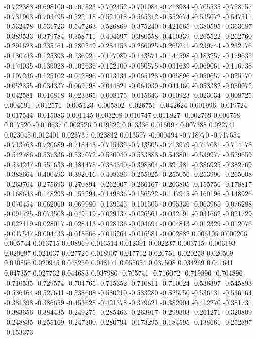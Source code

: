 -0.722388
-0.698100
-0.707323
-0.702452
-0.701084
-0.718984
-0.705535
-0.758757
-0.731903
-0.703495
-0.522118
-0.524018
-0.565312
-0.552674
-0.535072
-0.547311
-0.532478
-0.531723
-0.547263
-0.526869
-0.375240
-0.421665
-0.380595
-0.363687
-0.389533
-0.379784
-0.358711
-0.404697
-0.380558
-0.410339
-0.265522
-0.262760
-0.291628
-0.235461
-0.280249
-0.284153
-0.266025
-0.265241
-0.239744
-0.232176
-0.180743
-0.125393
-0.136921
-0.177089
-0.143571
-0.144598
-0.183257
-0.179635
-0.174035
-0.139028
-0.102636
-0.122100
-0.050575
-0.031639
-0.069061
-0.116738
-0.107246
-0.125102
-0.042896
-0.013134
-0.065128
-0.065896
-0.050657
-0.025170
-0.052355
-0.034337
-0.069798
-0.044821
-0.064039
-0.041460
-0.053382
-0.050072
-0.042581
-0.016818
-0.023365
-0.008175
-0.015643
-0.010923
-0.023034
-0.008725
0.004591
-0.012571
-0.005123
-0.005802
-0.026751
-0.042624
0.001996
-0.019724
-0.017544
-0.015083
0.001145
0.003208
0.010747
0.011827
-0.002769
0.006758
0.017520
-0.010637
0.002526
0.019522
0.013336
0.016097
0.007388
0.022741
0.023045
0.012401
0.023737
0.023812
0.013597
-0.000494
-0.718770
-0.717654
-0.713763
-0.720689
-0.718443
-0.715435
-0.713505
-0.713979
-0.717081
-0.714178
-0.542786
-0.537336
-0.537072
-0.530040
-0.533888
-0.543801
-0.539977
-0.529659
-0.534247
-0.551633
-0.384478
-0.384340
-0.398804
-0.394381
-0.386925
-0.382769
-0.388664
-0.400493
-0.382016
-0.408386
-0.255925
-0.255056
-0.253990
-0.265008
-0.263764
-0.275693
-0.270894
-0.262007
-0.266167
-0.263805
-0.155756
-0.178817
-0.168643
-0.148293
-0.155294
-0.149836
-0.156522
-0.147945
-0.160196
-0.148926
-0.070454
-0.062060
-0.069980
-0.139545
-0.101505
-0.095336
-0.063965
-0.076288
-0.091725
-0.073508
-0.049119
-0.029137
-0.026561
-0.032191
-0.031662
-0.021729
-0.022119
-0.028017
-0.028413
-0.028136
-0.004694
-0.004813
-0.012329
-0.012076
-0.017547
-0.004433
-0.018666
-0.015264
-0.016581
-0.002882
0.006105
0.000206
0.005744
0.013715
0.008969
0.013514
0.012391
0.002237
0.003715
-0.003193
0.029097
0.021037
0.027726
0.018907
0.017712
0.020751
0.020258
0.020509
0.030856
0.020945
0.048250
0.048171
0.055654
0.037508
0.034269
0.041641
0.047357
0.027732
0.044683
0.037986
-0.705741
-0.716072
-0.719890
-0.704896
-0.710535
-0.729574
-0.704765
-0.715352
-0.710811
-0.710024
-0.536397
-0.545893
-0.536164
-0.527641
-0.538608
-0.580210
-0.533280
-0.525750
-0.536131
-0.536164
-0.381398
-0.386659
-0.453628
-0.421378
-0.379621
-0.382904
-0.412270
-0.381731
-0.383656
-0.384435
-0.249275
-0.285463
-0.263917
-0.299303
-0.261271
-0.320809
-0.248835
-0.255169
-0.247300
-0.280794
-0.173295
-0.184595
-0.138661
-0.252397
-0.153373
